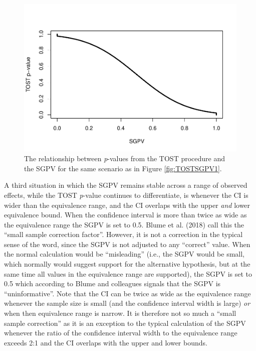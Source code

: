 \documentclass[,man,floatsintext]{apa6}
\begin{document}
\begin{figure}
\centering
\includegraphics{manuscript.R2_files/figure-latex/TOSTSGPV5-1.pdf}
\caption{\label{fig:TOSTSGPV5}The relationship between \emph{p}-values from the TOST procedure and the SGPV for the same scenario as in Figure \ref{fig:TOSTSGPV1}.}
\end{figure}

A third situation in which the SGPV remains stable across a range of observed effects, while the TOST \emph{p}-value continues to differentiate, is whenever the CI is wider than the equivalence range, and the CI overlaps with the upper \emph{and} lower equivalence bound. When the confidence interval is more than twice as wide as the equivalence range the SGPV is set to 0.5. Blume et al. (2018) call this the \enquote{small sample correction factor}. However, it is not a correction in the typical sense of the word, since the SGPV is not adjusted to any \enquote{correct} value. When the normal calculation would be \enquote{misleading} (i.e., the SGPV would be small, which normally would suggest support for the alternative hypothesis, but at the same time all values in the equivalence range are supported), the SGPV is set to 0.5 which according to Blume and colleagues signals that the SGPV is \enquote{uninformative}. Note that the CI can be twice as wide as the equivalence range whenever the sample size is small (and the confidence interval width is large) \emph{or} when then equivalence range is narrow. It is therefore not so much a \enquote{small sample correction} as it is an exception to the typical calculation of the SGPV whenever the ratio of the confidence interval width to the equivalence range exceeds 2:1 and the CI overlaps with the upper and lower bounds.
\end{document}
